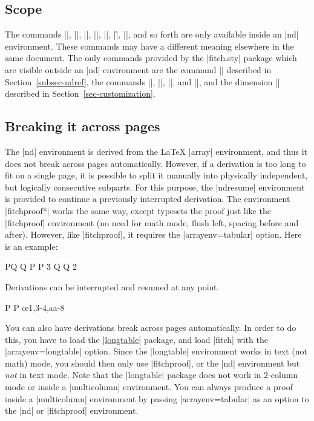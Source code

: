 \documentclass{ltxdoc}
\newcommand\NewIn[1]{\leavevmode
  \marginpar{\hfill\fbox{\fbox{New in #1}}\hspace*{1em}}\ignorespaces}
\begin{document}
\subsection{Scope}

The commands |\hypo|, |\have|, |\open|, |\close|, |\by|, |\r|, |\ii|, and so
forth are only available inside an |nd| environment. These commands
may have a different meaning elsewhere in the same document. The only
commands provided by the |fitch.sty|  package which are visible
outside an |nd| environment are the command |\ndref| described in
Section~\ref{subsec-ndref}, the commands |\ndrules|, |\ndjustformat|,
|\ndrefformat|, and |\nddim|, and the dimension |\ndindent| described
in Section~\ref{sec-customization}.

\subsection{Breaking it across pages}\label{subsec-break}

The |nd| environment is derived from the {\LaTeX} |array|
environment, and thus it does not break across pages automatically. 
However, if a derivation is too long to fit on a single page, it is
possible to split it manually into physically independent, but
logically consecutive subparts. For this purpose, the |ndresume|
environment is provided to continue a previously interrupted
derivation. 
\NewIn{1.0} The environment |fitchproof*| works the same way, except typesets the
proof just like the |fitchproof| environment (no need for math mode,
flush left, spacing before and after). However, like |fitchproof|, it
requires the |arrayenv=tabular| option. Here is an example:

\begin{LTXexample}
\begin{fitchproof}[arrayenv=tabular]
    {P\vee Q}
    {\neg Q}
  \open
   {P}
   {P}      \r{3}
  \close
  \open
   {Q}
   {\neg Q} \r{2}
\end{fitchproof}
Derivations can be interrupted and 
resumed at any point.
\begin{fitchproof*}[arrayenv=tabular]
   {\bot}  
   {P}     
  \close
   {P}     \oe{1,3-4,aa-8}
\end{fitchproof*}
\end{LTXexample}

\NewIn{1.0} You can also have derivations break across pages
automatically. In order to do this, you have to load the
\href{https://ctan.org/pkg/longtable}{|longtable|} package, and load
|fitch| with the |arrayenv=longtable| option. Since the |longtable|
environment works in text (not math) mode, you should then only use
|fitchproof|, or the |nd| environment but \emph{not} in text mode.
Note that the |longtable| package does not work in 2-column mode or
inside a |multicolumn| environment. You can always produce a proof
inside a |multicolumn| environment by passing |arrayenv=tabular| as an
option to the |nd| or |fitchproof| environment.
\end{document}
